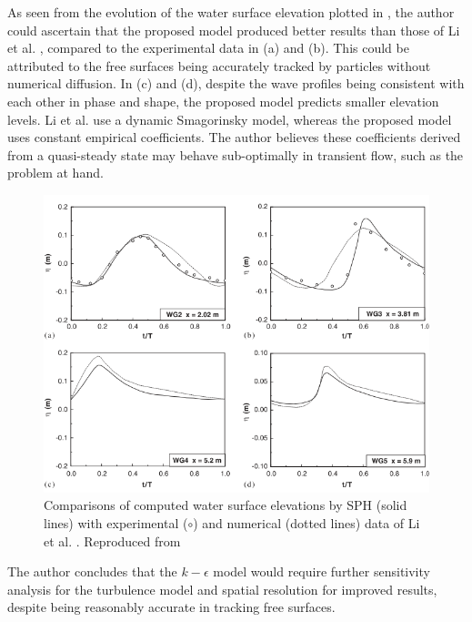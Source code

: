 As seen from the evolution of the water surface elevation plotted in , the author could ascertain that the proposed model produced better results than those of Li et al. \parencite{li2004wave}, compared to the experimental data in (a) and (b). This could be attributed to the free surfaces being accurately tracked by particles without numerical diffusion. 
In (c) and (d), despite the wave profiles being consistent with each other in phase and shape, the proposed model predicts smaller elevation levels. Li et al. use a dynamic Smagorinsky model, whereas the proposed model uses constant empirical coefficients. The author believes these coefficients derived from a quasi-steady state may behave sub-optimally in transient flow, such as the problem at hand.
\begin{figure}[H]
    \centering
    \includegraphics[scale=0.9]{Figures/research_papers/Shao2006-water-surf-elevations.png}
    \caption{Comparisons of computed water surface elevations by SPH (solid lines) with experimental ($\circ$) and numerical (dotted lines) data of Li et al. \parencite{li2004wave}. Reproduced from \cite{Shao2006}}
    \label{fig:Shao2006-water-surf-elevations}
\end{figure}

The author concludes that the $k-\epsilon$ model would require further sensitivity analysis for the turbulence model and spatial resolution for improved results, despite being reasonably accurate in tracking free surfaces.


